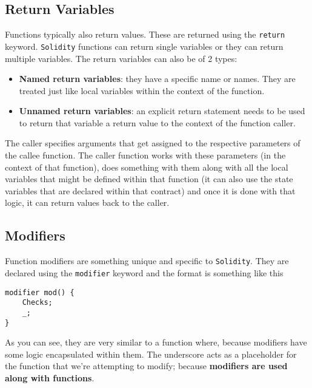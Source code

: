 \subsection*{Return Variables}

Functions typically also return values.
These are returned using the \texttt{return} keyword. \texttt{Solidity} functions can return single variables or they can return multiple variables.
The return variables can also be of 2 types:

\begin{itemize}

   \item\textbf{Named return variables}: they have a specific name or names.
   They are treated just like local variables within the context of the function.

   \item\textbf{Unnamed return variables}: an explicit return statement needs to be used to return that variable a return value to the context of the function caller.

\end{itemize}

The caller specifies arguments that get assigned to the respective parameters of the callee function.
The caller function works with these parameters (in the context of that function), does something with them along with all the local variables that might be defined within that function (it can also use the state variables that are declared within that contract) and once it is done with that logic, it can return values back to the caller.

\subsection*{Modifiers}

Function modifiers are something unique and specific to \texttt{Solidity}.
They are declared using the \texttt{modifier} keyword and the format is something like this

\begin{lstlisting}[language=Solidity, style=solStyle, caption={Modifier example.}]
modifier mod() {
    Checks;
    _;
}
\end{lstlisting}

As you can see, they are very similar to a function where, because modifiers have some logic encapsulated within them.
The underscore acts as a placeholder for the function that we're attempting to modify; because \textbf{modifiers are used along with functions}.\\

